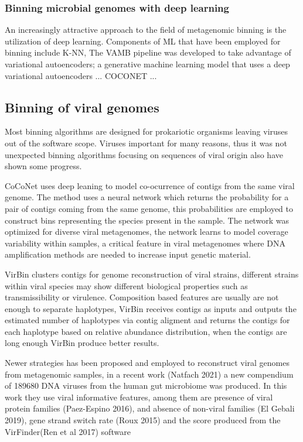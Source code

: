 \documentclass{article}
\begin{document}
\subsubsection{Binning microbial genomes with deep learning}
An increasingly attractive approach to the field of metagenomic binning is the utilization of deep learning.
Components of ML that have been employed for binning include K-NN, 
The \gls{VAMB} pipeline was developed to take advantage of variational autoencoders; a generative machine learning model that uses a deep variational autoencoders \cite{nissenimproved}...
COCONET \cite{arisdakessian2021coconet}...

\subsection{Binning of viral genomes}

Most binning algorithms are designed for prokariotic organisms leaving viruses out of the software scope. Viruses important for many reasons, thus it was not unexpected binning algorithms focusing on sequences of viral origin also have shown some progress. 

CoCoNet uses deep leaning to model co-ocurrence of contigs from the same viral genome. The method uses a neural network which returns the probability for a pair of contigs coming  from the same genome, this probabilities are employed to construct bins representing the species present in the sample. The network was optimized for diverse viral metagenomes, the network learns to model coverage variability within samples, a critical feature in viral metagenomes where DNA amplification methods are needed to increase input genetic material.

VirBin clusters contigs for genome reconstruction of viral strains, different strains within viral species may show different biological properties such as transmissibility or virulence. Composition based features are usually are not enough to separate haplotypes, VirBin receives contigs as inputs and outputs the estimated number of haplotypes via contig aligment and returns the contigs for each haplotype based on relative abundance distribution, when the contigs are long enough VirBin produce better results.

Newer strategies has been proposed and employed to reconstruct viral genomes from metagenomic samples, in a recent work (Natfach 2021) a new compendium of 189680 DNA viruses from the human gut microbiome was produced. In this work they use viral informative features, among them are presence of viral protein families (Paez-Espino 2016), and absence of non-viral families (El Gebali 2019), gene strand switch rate (Roux 2015) and the score produced from the VirFinder(Ren et al 2017) software  
\end{document}
